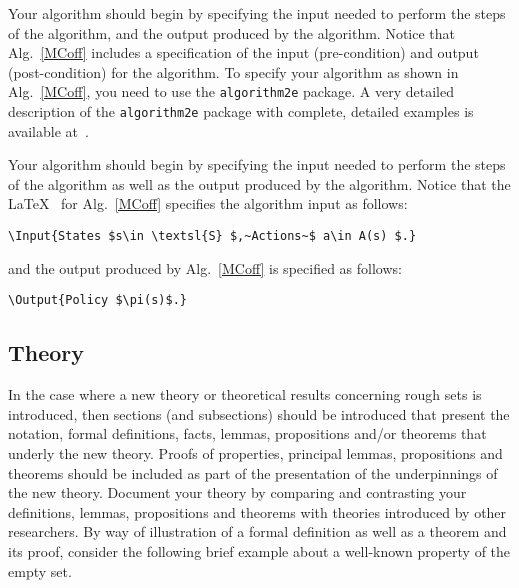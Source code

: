\documentclass{llncs}
\begin{document}
Your algorithm should begin by specifying the input needed to perform the steps of the algorithm, and the output produced by the algorithm.   Notice that Alg.~\ref{MCoff} includes a specification of the input (pre-condition) and output (post-condition) for the algorithm.  To specify your algorithm as shown in Alg.~\ref{MCoff}, you need to use the \verb|algorithm2e| package.  A very detailed description of the \verb|algorithm2e| package with complete, detailed examples is available at~\cite{alg2e}.

Your algorithm should begin by specifying the input needed to perform the steps of the algorithm as well as the output produced by the algorithm.   Notice that the \LaTeX~ for Alg.~\ref{MCoff} specifies the algorithm input as follows:

\begin{verbatim}
\Input{States $s\in \textsl{S} $,~Actions~$ a\in A(s) $.}
\end{verbatim}

\noindent and the output produced by Alg.~\ref{MCoff} is specified as follows:

\begin{verbatim}
\Output{Policy $\pi(s)$.}
\end{verbatim}

\subsection{Theory} In the case where a new theory or theoretical results concerning rough sets is introduced, then sections (and subsections) should be introduced that present the notation, formal definitions, facts, lemmas, propositions and/or theorems that underly the new theory.  Proofs of properties, principal lemmas, propositions and theorems should be included as part of the presentation of the underpinnings of the new theory.  Document your theory by comparing and contrasting your definitions, lemmas, propositions and theorems with theories introduced by other researchers.  By way of illustration of a formal definition as well as a theorem and its proof, consider the following brief example about a well-known property of the empty set.
\end{document}
